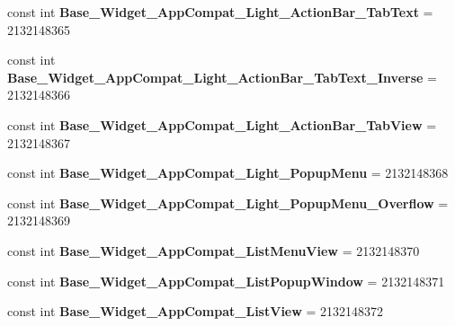 \begin{DoxyCompactItemize}
\item 
\mbox{\label{classst_delivery_1_1_resource_1_1_style_a96f82dacc1e7df644a35d098bf8ac2a0}} 
const int {\bfseries Base\+\_\+\+Widget\+\_\+\+App\+Compat\+\_\+\+Light\+\_\+\+Action\+Bar\+\_\+\+Tab\+Text} = 2132148365
\item 
\mbox{\label{classst_delivery_1_1_resource_1_1_style_ab1e442e160d79339d8c41733fbaaf5da}} 
const int {\bfseries Base\+\_\+\+Widget\+\_\+\+App\+Compat\+\_\+\+Light\+\_\+\+Action\+Bar\+\_\+\+Tab\+Text\+\_\+\+Inverse} = 2132148366
\item 
\mbox{\label{classst_delivery_1_1_resource_1_1_style_afeda93374848ba3d05faeb303a1c99b0}} 
const int {\bfseries Base\+\_\+\+Widget\+\_\+\+App\+Compat\+\_\+\+Light\+\_\+\+Action\+Bar\+\_\+\+Tab\+View} = 2132148367
\item 
\mbox{\label{classst_delivery_1_1_resource_1_1_style_a76e94fa720222129f72c2fceed02e544}} 
const int {\bfseries Base\+\_\+\+Widget\+\_\+\+App\+Compat\+\_\+\+Light\+\_\+\+Popup\+Menu} = 2132148368
\item 
\mbox{\label{classst_delivery_1_1_resource_1_1_style_a87fe84a76d0cca66dae765fd717fe04e}} 
const int {\bfseries Base\+\_\+\+Widget\+\_\+\+App\+Compat\+\_\+\+Light\+\_\+\+Popup\+Menu\+\_\+\+Overflow} = 2132148369
\item 
\mbox{\label{classst_delivery_1_1_resource_1_1_style_ac021203560d63762b5ef8c450af29750}} 
const int {\bfseries Base\+\_\+\+Widget\+\_\+\+App\+Compat\+\_\+\+List\+Menu\+View} = 2132148370
\item 
\mbox{\label{classst_delivery_1_1_resource_1_1_style_a176dbd74aa736909450ad4c4f5916259}} 
const int {\bfseries Base\+\_\+\+Widget\+\_\+\+App\+Compat\+\_\+\+List\+Popup\+Window} = 2132148371
\item 
\mbox{\label{classst_delivery_1_1_resource_1_1_style_a300ce9e5573f920d2e1ce83a12ae243a}} 
const int {\bfseries Base\+\_\+\+Widget\+\_\+\+App\+Compat\+\_\+\+List\+View} = 2132148372

\end{DoxyCompactItemize}

